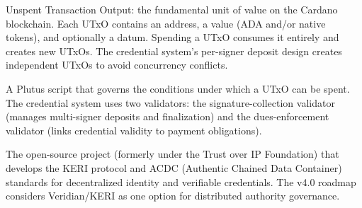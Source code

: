 \begin{description}[style=nextline, leftmargin=2.5cm, labelwidth=2.3cm]
\item[UTxO]
  Unspent Transaction Output: the fundamental unit of value on the Cardano
  blockchain.  Each UTxO contains an address, a value (ADA and/or native
  tokens), and optionally a datum.  Spending a UTxO consumes it entirely and
  creates new UTxOs.  The credential system's per-signer deposit design
  creates independent UTxOs to avoid concurrency conflicts.

\item[Validator]
  A Plutus script that governs the conditions under which a UTxO can be
  spent.  The credential system uses two validators: the
  signature-collection validator (manages multi-signer deposits and
  finalization) and the dues-enforcement validator (links credential
  validity to payment obligations).

\item[Veridian]
  The open-source project (formerly under the Trust over IP Foundation) that
  develops the KERI protocol and ACDC (Authentic Chained Data Container)
  standards for decentralized identity and verifiable credentials.  The v4.0
  roadmap considers Veridian/KERI as one option for distributed authority
  governance.

\end{description}
